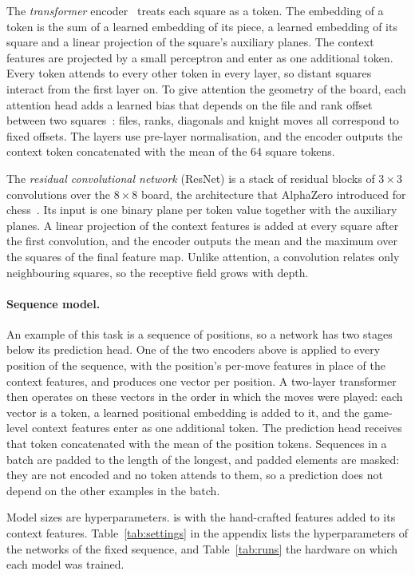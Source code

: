 The \emph{transformer} encoder~\cite{attention} treats each square as a token.
The embedding of a token is the sum of a learned embedding of its piece, a
learned embedding of its square and a linear projection of the square's
auxiliary planes. The context features are projected by a small perceptron
and enter as one additional token. Every token attends to every other token
in every layer, so distant squares interact from the first layer on. To give
attention the geometry of the board, each attention head adds a learned bias
that depends on the file and rank offset between two
squares~\cite{relative}: files, ranks, diagonals and knight moves all
correspond to fixed offsets. The layers use pre-layer normalisation, and the
encoder outputs the context token concatenated with the mean of the 64 square
tokens.

The \emph{residual convolutional network} (ResNet) is a stack of residual
blocks of $3\times3$ convolutions over the $8\times8$ board, the architecture
that AlphaZero introduced for chess~\cite{alphazero}. Its input is one binary
plane per token value together with the auxiliary planes. A linear projection
of the context features is added at every square after the first convolution,
and the encoder outputs the mean and the maximum over the squares of the
final feature map. Unlike attention, a convolution relates only neighbouring
squares, so the receptive field grows with depth.

\ifsequence
\paragraph{Sequence model.}
An example of this task is a sequence of positions, so a network has two
stages below its prediction head. One of the two encoders above is applied to
every position of the sequence, with the position's per-move features in
place of the context features, and produces one vector per position. A
two-layer transformer then operates on these vectors in the order in which
the moves were played: each vector is a token, a learned positional embedding
is added to it, and the game-level context features enter as one additional
token. The prediction head receives that token concatenated with the mean of
the position tokens. Sequences in a batch are padded to the length of the
longest, and padded elements are masked: they are not encoded and no token
attends to them, so a prediction does not depend on the other examples in
the batch.

\fi
Model sizes are hyperparameters.  is
 with the hand-crafted features added to its context
features. Table~\ref{tab:settings} in the appendix lists the hyperparameters
of the networks of the fixed sequence, and Table~\ref{tab:runs} the hardware
on which each model was trained.

